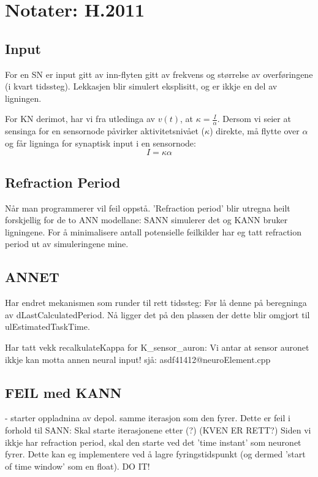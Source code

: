 \section{Notater: H.2011}
	\subsection{Input}
	For en SN er input gitt av inn-flyten gitt av frekvens og størrelse av overføringene (i kvart tidssteg).
	Lekkasjen blir simulert eksplisitt, og er ikkje en del av ligningen.

	For KN derimot, har vi fra utledinga av $v(t)$, at $\kappa = \frac{I}{\alpha}$. 
	Dersom vi seier at sensinga for en sensornode påvirker aktivitetsnivået ($\kappa$) direkte, må flytte over $\alpha$ og får ligninga for synaptisk input i en sensornode:
\begin{equation}
	I = \kappa \alpha
\end{equation}

	\subsection{Refraction Period}
	Når man programmerer vil feil oppstå. 
	'Refraction period' blir utregna heilt forskjellig for de to ANN modellane: SANN simulerer det og KANN bruker ligningene.
	For å minimalisere antall potensielle feilkilder har eg tatt refraction period ut av simuleringene mine. 

	\subsection{ANNET}
	Har endret mekanismen som runder til rett tidssteg: Før lå denne på beregninga av dLastCalculatedPeriod. Nå ligger det på den plassen der dette blir omgjort til ulEstimatedTaskTime.	

	Har tatt vekk recalkulateKappa for K\_sensor\_auron: Vi antar at sensor auronet ikkje kan motta annen neural input! sjå: asdf41412@neuroElement.cpp

	\subsection{FEIL med KANN}
	- starter oppladnina av depol. samme iterasjon som den fyrer. Dette er feil i forhold til SANN: Skal starte iterasjonene etter (?)
	(KVEN ER RETT?)
	Siden vi ikkje har refraction period, skal den starte ved det 'time instant' som neuronet fyrer. Dette kan eg implementere ved å lagre fyringstidspunkt (og dermed 'start of time window' som en float). DO IT!

